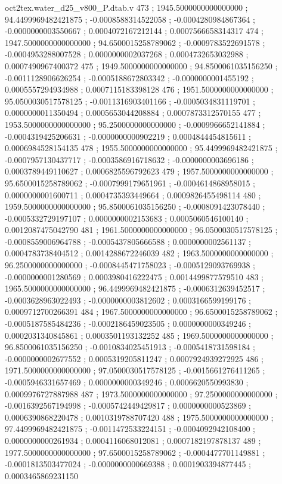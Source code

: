 \begin{filecontents}[overwrite]{oct2tex.water_d25_v800_P.dtab.v}
473 ; 1945.5000000000000000 ; 94.4499969482421875 ; -0.0008588314522058 ; -0.0004280984867364 ; -0.0000000003550667 ; 0.0004072167212144 ; 0.0007566658314317
474 ; 1947.5000000000000000 ; 94.6500015258789062 ; -0.0009783522691578 ; -0.0004953288007528 ; 0.0000000002037268 ; 0.0004732653032988 ; 0.0007490967400372
475 ; 1949.5000000000000000 ; 94.8500061035156250 ; -0.0011128906626254 ; -0.0005188672803342 ; -0.0000000001455192 ; 0.0005557294934988 ; 0.0007115183398128
476 ; 1951.5000000000000000 ; 95.0500030517578125 ; -0.0011316903401166 ; -0.0005034831119701 ; 0.0000000011350494 ; 0.0005653044208884 ; 0.0007873312570155
477 ; 1953.5000000000000000 ; 95.2500000000000000 ; -0.0009966652141884 ; -0.0004319425206631 ; -0.0000000000902219 ; 0.0004844454815611 ; 0.0006984528154135
478 ; 1955.5000000000000000 ; 95.4499969482421875 ; -0.0007957130437717 ; -0.0003586916718632 ; -0.0000000003696186 ; 0.0003789449110627 ; 0.0006825596792623
479 ; 1957.5000000000000000 ; 95.6500015258789062 ; -0.0007999179651961 ; -0.0004614868958015 ; 0.0000000001600711 ; 0.0004735393449664 ; 0.0009826455498114
480 ; 1959.5000000000000000 ; 95.8500061035156250 ; -0.0008091423078440 ; -0.0005332729197107 ; 0.0000000002153683 ; 0.0005060546100140 ; 0.0012087475042790
481 ; 1961.5000000000000000 ; 96.0500030517578125 ; -0.0008559006964788 ; -0.0005437805666588 ; 0.0000000002561137 ; 0.0004783738404512 ; 0.0014288672246039
482 ; 1963.5000000000000000 ; 96.2500000000000000 ; -0.0008445471758023 ; -0.0005129093769938 ; -0.0000000001280569 ; 0.0003980416222475 ; 0.0014499877579510
483 ; 1965.5000000000000000 ; 96.4499969482421875 ; -0.0006312639452517 ; -0.0003628963022493 ; -0.0000000003812602 ; 0.0003166599199176 ; 0.0009712700266391
484 ; 1967.5000000000000000 ; 96.6500015258789062 ; -0.0005187585484236 ; -0.0002186459023505 ; 0.0000000000349246 ; 0.0002031340845861 ; 0.0003501193132252
485 ; 1969.5000000000000000 ; 96.8500061035156250 ; -0.0010834025451913 ; -0.0005418731598184 ; -0.0000000002677552 ; 0.0005319205811247 ; 0.0007924939272925
486 ; 1971.5000000000000000 ; 97.0500030517578125 ; -0.0015661276411265 ; -0.0005946331657469 ; 0.0000000000349246 ; 0.0006620550993830 ; 0.0009976727887988
487 ; 1973.5000000000000000 ; 97.2500000000000000 ; -0.0016392567194998 ; -0.0005742449429817 ; 0.0000000000523869 ; 0.0006390868220478 ; 0.0010319788707420
488 ; 1975.5000000000000000 ; 97.4499969482421875 ; -0.0011472533224151 ; -0.0004092942108400 ; 0.0000000000261934 ; 0.0004116068012081 ; 0.0007182197878137
489 ; 1977.5000000000000000 ; 97.6500015258789062 ; -0.0004477701149881 ; -0.0001813503477024 ; -0.0000000000669388 ; 0.0001903394877445 ; 0.0003465869231150

\end{filecontents}
